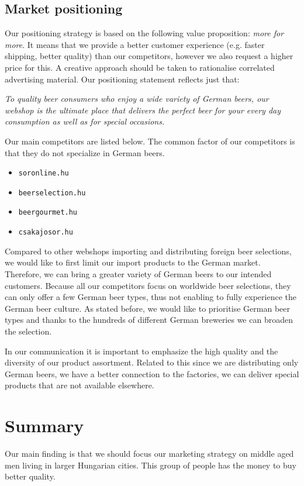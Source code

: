 \subsection{Market positioning}


Our positioning strategy is based on the following value proposition:  \textit{more for more}. It means that we provide a better customer experience (e.g. faster shipping, better quality) than our competitors, however we also request a higher price for this. A creative approach should be taken to rationalise correlated advertising material. Our positioning statement reflects just that:

\textit{To quality beer consumers who enjoy a wide variety of German beers, our webshop is the ultimate place that delivers the perfect beer for your every day consumption as well as for special occasions.}



Our main competitors are listed below. The common factor of our competitors is that they do not specialize in German beers.
\begin{itemize}
   \item \texttt{soronline.hu} \cite{soronline}
   \item \texttt{beerselection.hu} \cite{beerselection}
   \item \texttt{beergourmet.hu} \cite{beergourmet}
   \item \texttt{csakajosor.hu} \cite{csakajosor}
\end{itemize}
Compared to other webshops importing and distributing foreign beer selections, we would like to first limit our import products to the German market. Therefore, we can bring a greater variety of German beers to our intended customers. Because all our competitors focus on worldwide beer selections, they can only offer a few German beer types, thus not enabling to fully experience the German beer culture. As stated before, we would like to prioritise German beer types and thanks to the hundreds of different German breweries we can broaden the selection.

In our communication it is important to emphasize the high quality and the diversity of our product assortment. Related to this since we are distributing only German beers, we have a better connection to the factories, we can deliver special products that are not available elsewhere.


\section{Summary}
Our main finding is that we should focus our marketing strategy on middle aged men living in larger Hungarian cities. This group of people has the money to buy better quality.



